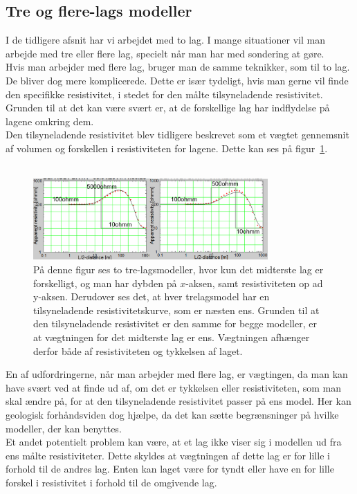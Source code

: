 \subsection{Tre og flere-lags modeller}
I de tidligere afsnit har vi arbejdet med to lag. I mange situationer vil man arbejde med tre eller flere lag, specielt når man har med sondering at gøre. \\
Hvis man arbejder med flere lag, bruger man de samme teknikker, som til to lag. De bliver dog mere komplicerede. Dette er især tydeligt, hvis man gerne vil finde den specifikke resistivitet, i stedet for den målte tilsyneladende resistivitet. Grunden til at det kan være svært er, at de forskellige lag har indflydelse på lagene omkring dem.\\
%
Den tilsyneladende resistivitet blev tidligere beskrevet som et vægtet gennemsnit af volumen og forskellen i resistiviteten for lagene. Dette kan ses på figur~\ref{fig:Tre-lagsmodel_tilres}. \\ \\
%
%
\begin{figure}
    \centering
    \includegraphics[width=0.8\textwidth]{Geo/Figurer/tilsynelsadet_resistivitet.png}
    \caption{På denne figur ses to tre-lagsmodeller, hvor kun det midterste lag er forskelligt, og man har dybden på $x$-aksen, samt resistiviteten op ad y-aksen. Derudover ses det, at hver trelagsmodel har en tilsyneladende resistivitetskurve, som er næsten ens. Grunden til at den tilsyneladende resistivitet er den samme for begge modeller, er at vægtningen for det midterste lag er ens. Vægtningen afhænger derfor både af resistiviteten og tykkelsen af laget.}
    \label{fig:Tre-lagsmodel_tilres}
\end{figure}
En af udfordringerne, når man arbejder med flere lag, er vægtingen, da man kan have svært ved at finde ud af, om det er tykkelsen eller resistiviteten, som man skal ændre på, for at den tilsyneladende resistivitet passer på ens model. Her kan geologisk forhåndsviden dog hjælpe, da det kan sætte begrænsninger på hvilke modeller, der kan benyttes. \\
%
Et andet potentielt problem kan være, at et lag ikke viser sig i modellen ud fra ens målte resistiviteter. Dette skyldes at vægtningen af dette lag er for lille i forhold til de andres lag. Enten kan laget være for tyndt eller have en for lille forskel i resistivitet i forhold til de omgivende lag.\\
